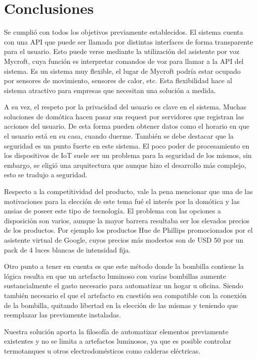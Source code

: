 \chapter{Conclusiones}

Se cumplió con todos los objetivos previamente establecidos. El sistema cuenta con una API que puede ser llamada por distintas interfaces de forma transparente para el usuario. Esto puede verse mediante la utilización del asistente por voz Mycroft, cuya función es interpretar comandos de voz para llamar a la API del sistema. Es un sistema muy flexible, el  lugar de Mycroft podría estar ocupado por sensores de movimiento, sensores de calor, etc. Esta flexibilidad hace al sistema atractivo para empresas que necesitan una solución a medida.

A su vez, el respeto por la privacidad del usuario es clave en el sistema. Muchas soluciones de domótica hacen pasar sus request por servidores que registran las acciones del usuario. De esta forma pueden obtener datos como el horario en que el usuario está en su casa, cuando duerme. También se debe destacar que la seguridad es un punto fuerte en este sistema. El poco poder de procesamiento en los dispositivos de IoT suele ser un problema para la seguridad de los mismos, sin embargo, se eligió una arquitectura que aunque hizo el desarrollo más complejo, esto se tradujo a seguridad.

Respecto a la competitividad del producto, vale la pena mencionar que una de las motivaciones para la elección de este tema fué el interés por la domótica y las ansias de poseer este tipo de tecnología. El problema con las opciones a disposición son varios, aunque la mayor barrera resultaba ser los elevados precios de los productos. Por ejemplo los productos Hue de Phillips promocionados por el asistente virtual de Google, cuyos precios más modestos son de USD 50 por un pack de 4 luces blancas de intensidad fija.

Otro punto a tener en cuenta es que este método donde la bombilla contiene la lógica resulta en que un artefacto luminoso con varias bombillas aumente sustancialmente el gasto necesario para automatizar un hogar u oficina. Siendo también necesario el que el artefacto en cuestión sea compatible con la conexión de la bombilla, quitando libertad en la elección de las mismas y teniendo que reemplazar las previamente instaladas.

Nuestra solución aporta la filosofía de automatizar elementos previamente existentes y no se limita a artefactos luminosos, ya que es posible controlar termotanques u otros electrodomésticos como calderas eléctricas.

